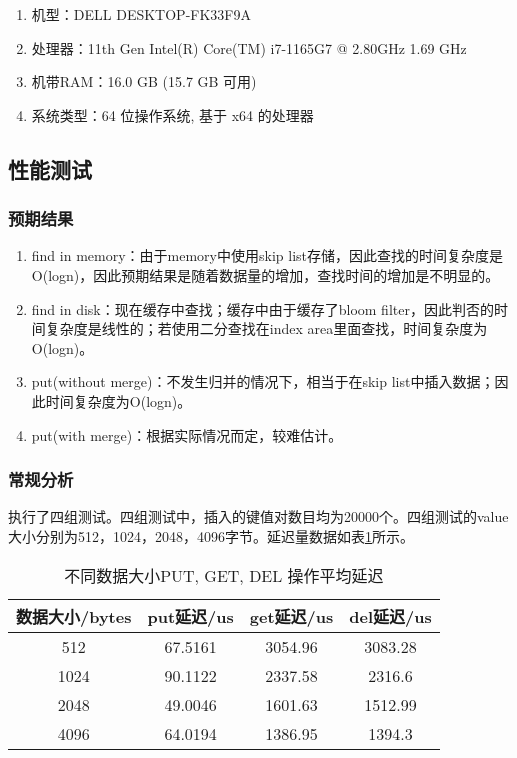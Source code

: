 \documentclass[fontset=windows]{article}
\begin{document}
\begin{enumerate}
    \item 机型：DELL DESKTOP-FK33F9A
    \item 处理器：11th Gen Intel(R) Core(TM) i7-1165G7 @ 2.80GHz   1.69 GHz
    \item 机带RAM：16.0 GB (15.7 GB 可用)
    \item 系统类型：64 位操作系统, 基于 x64 的处理器
\end{enumerate}

\subsection{性能测试}

\subsubsection{预期结果}

\begin{enumerate}
    \item find in memory：由于memory中使用skip list存储，因此查找的时间复杂度是O(logn)，因此预期结果是随着数据量的增加，查找时间的增加是不明显的。
    \item find in disk：现在缓存中查找；缓存中由于缓存了bloom filter，因此判否的时间复杂度是线性的；若使用二分查找在index area里面查找，时间复杂度为O(logn)。
    \item put(without merge)：不发生归并的情况下，相当于在skip list中插入数据；因此时间复杂度为O(logn)。
    \item put(with merge)：根据实际情况而定，较难估计。
\end{enumerate}

\subsubsection{常规分析}


执行了四组测试。四组测试中，插入的键值对数目均为20000个。四组测试的value大小分别为512，1024，2048，4096字节。延迟量数据如表\ref{table1}所示。

\begin{table}[h!]
    \begin{center}
      \caption{不同数据大小PUT, GET, DEL 操作平均延迟}
      \label{table1}
      \begin{tabular}{c|c|c|c}
        \textbf{数据大小/bytes} & \textbf{put延迟/us} & \textbf{get延迟/us} & \textbf{del延迟/us}\\
        \hline
        512 & 67.5161 & 3054.96 & 3083.28 \\
        1024 & 90.1122 & 2337.58 & 2316.6 \\
        2048 & 49.0046 & 1601.63 & 1512.99 \\
        4096 & 64.0194 & 1386.95 & 1394.3 \\
        \hline
      \end{tabular}
    \end{center}
\end{table}
\end{document}
